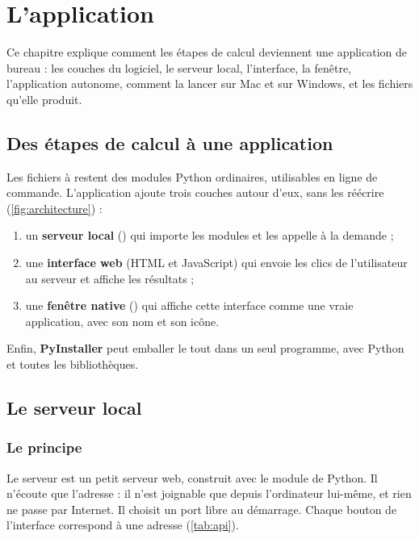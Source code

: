 \chapter{L'application}
\label{chap:application}

\begin{chapeau}
Ce chapitre explique comment les étapes de calcul deviennent une application de bureau : les couches du logiciel, le
serveur local, l'interface, la fenêtre, l'application autonome, comment la lancer sur Mac et sur Windows, et les
fichiers qu'elle produit.
\end{chapeau}

\section{Des étapes de calcul à une application}

Les fichiers  à  restent des modules Python ordinaires, utilisables en ligne de
commande. L'application ajoute trois couches autour d'eux, sans les réécrire (\cref{fig:architecture}) :
\begin{enumerate}
  \item un \textbf{serveur local} () qui importe les modules et les appelle à la
  demande ;
  \item une \textbf{interface web} (HTML et JavaScript) qui envoie les clics de l'utilisateur au serveur et affiche les
  résultats ;
  \item une \textbf{fenêtre native} () qui affiche cette interface comme une vraie
  application, avec son nom et son icône.
\end{enumerate}
Enfin, \textbf{PyInstaller} peut emballer le tout dans un seul programme, avec Python et toutes les bibliothèques.


\section{Le serveur local}
\label{sec:serveur}

\subsection{Le principe}

Le serveur est un petit serveur web, construit avec le module  de Python. Il n'écoute que l'adresse
 : il n'est joignable que depuis l'ordinateur lui-même, et rien ne passe par Internet. Il choisit un
port libre au démarrage. Chaque bouton de l'interface correspond à une adresse (\cref{tab:api}).

